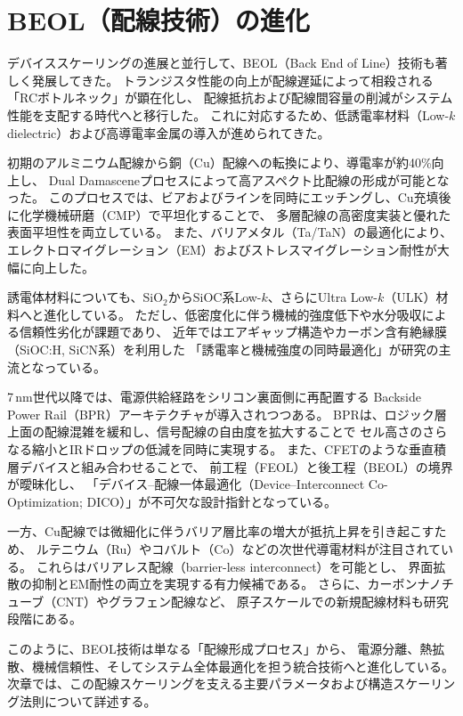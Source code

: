 \section{BEOL（配線技術）の進化}
デバイススケーリングの進展と並行して、BEOL（Back End of Line）技術も著しく発展してきた。  
トランジスタ性能の向上が配線遅延によって相殺される「RCボトルネック」が顕在化し、  
配線抵抗および配線間容量の削減がシステム性能を支配する時代へと移行した。  
これに対応するため、低誘電率材料（Low-$k$ dielectric）および高導電率金属の導入が進められてきた。

初期のアルミニウム配線から銅（Cu）配線への転換により、導電率が約40\%向上し、  
Dual Damasceneプロセスによって高アスペクト比配線の形成が可能となった。  
このプロセスでは、ビアおよびラインを同時にエッチングし、Cu充填後に化学機械研磨（CMP）で平坦化することで、  
多層配線の高密度実装と優れた表面平坦性を両立している。  
また、バリアメタル（Ta/TaN）の最適化により、エレクトロマイグレーション（EM）およびストレスマイグレーション耐性が大幅に向上した。

誘電体材料についても、SiO$_2$からSiOC系Low-$k$、さらにUltra Low-$k$（ULK）材料へと進化している。  
ただし、低密度化に伴う機械的強度低下や水分吸収による信頼性劣化が課題であり、  
近年ではエアギャップ構造やカーボン含有絶縁膜（SiOC:H, SiCN系）を利用した  
「誘電率と機械強度の同時最適化」が研究の主流となっている。  

7\,nm世代以降では、電源供給経路をシリコン裏面側に再配置する  
Backside Power Rail（BPR）アーキテクチャが導入されつつある。  
BPRは、ロジック層上面の配線混雑を緩和し、信号配線の自由度を拡大することで  
セル高さのさらなる縮小とIRドロップの低減を同時に実現する。  
また、CFETのような垂直積層デバイスと組み合わせることで、  
前工程（FEOL）と後工程（BEOL）の境界が曖昧化し、  
「デバイス–配線一体最適化（Device–Interconnect Co-Optimization; DICO）」が不可欠な設計指針となっている。

一方、Cu配線では微細化に伴うバリア層比率の増大が抵抗上昇を引き起こすため、  
ルテニウム（Ru）やコバルト（Co）などの次世代導電材料が注目されている。  
これらはバリアレス配線（barrier-less interconnect）を可能とし、  
界面拡散の抑制とEM耐性の両立を実現する有力候補である。  
さらに、カーボンナノチューブ（CNT）やグラフェン配線など、  
原子スケールでの新規配線材料も研究段階にある。

このように、BEOL技術は単なる「配線形成プロセス」から、  
電源分離、熱拡散、機械信頼性、そしてシステム全体最適化を担う統合技術へと進化している。  
次章では、この配線スケーリングを支える主要パラメータおよび構造スケーリング法則について詳述する。



